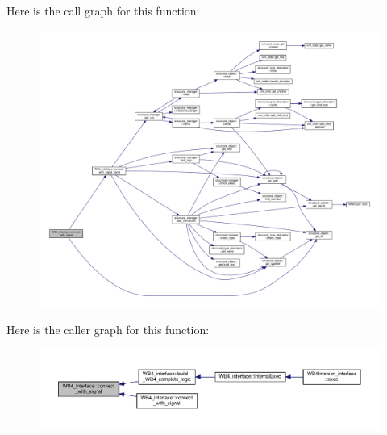 Here is the call graph for this function\+:
\nopagebreak
\begin{figure}[H]
\begin{center}
\leavevmode
\includegraphics[width=350pt]{d5/d7a/classWB4__interface_ac4a503a75aef89a9cfd1927cccd37c6b_cgraph}
\end{center}
\end{figure}
Here is the caller graph for this function\+:
\nopagebreak
\begin{figure}[H]
\begin{center}
\leavevmode
\includegraphics[width=350pt]{d5/d7a/classWB4__interface_ac4a503a75aef89a9cfd1927cccd37c6b_icgraph}
\end{center}
\end{figure}
\mbox{\label{classWB4__interface_ab9486d63109bdb72a6b342e39bd50777}} 
